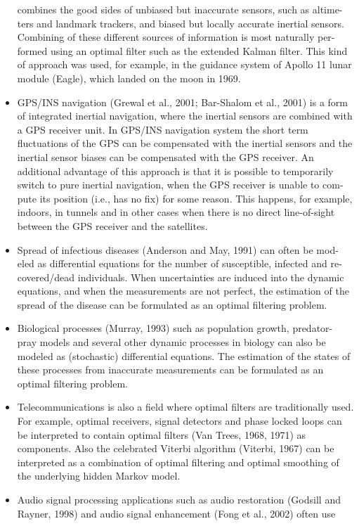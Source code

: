\documentclass[10pt]{llncs}
\begin{document}
\begin{itemize}
combines the good sides of unbiased but inaccurate sensors, such as altime-
ters and landmark trackers, and biased but locally accurate inertial sensors.
Combining of these different sources of information is most naturally per-
formed using an optimal filter such as the extended Kalman filter. This kind
of approach was used, for example, in the guidance system of Apollo 11
lunar module (Eagle), which landed on the moon in 1969.
\item GPS/INS navigation (Grewal et al., 2001; Bar-Shalom et al., 2001) is a form
of integrated inertial navigation, where the inertial sensors are combined
with a GPS receiver unit. In GPS/INS navigation system the short term
fluctuations of the GPS can be compensated with the inertial sensors and
the inertial sensor biases can be compensated with the GPS receiver. An
additional advantage of this approach is that it is possible to temporarily
switch to pure inertial navigation, when the GPS receiver is unable to com-
pute its position (i.e., has no fix) for some reason. This happens, for example,
indoors, in tunnels and in other cases when there is no direct line-of-sight
between the GPS receiver and the satellites.
\item Spread of infectious diseases (Anderson and May, 1991) can often be mod-
eled as differential equations for the number of susceptible, infected and re-
covered/dead individuals. When uncertainties are induced into the dynamic
equations, and when the measurements are not perfect, the estimation of the
spread of the disease can be formulated as an optimal filtering problem.
\item Biological processes (Murray, 1993) such as population growth, predator-
pray models and several other dynamic processes in biology can also be
modeled as (stochastic) differential equations. The estimation of the states
of these processes from inaccurate measurements can be formulated as an
optimal filtering problem.
\item Telecommunications is also a field where optimal filters are traditionally
used. For example, optimal receivers, signal detectors and phase locked
loops can be interpreted to contain optimal filters (Van Trees, 1968, 1971)
as components. Also the celebrated Viterbi algorithm (Viterbi, 1967) can be
interpreted as a combination of optimal filtering and optimal smoothing of
the underlying hidden Markov model.
\item Audio signal processing applications such as audio restoration (Godsill and
Rayner, 1998) and audio signal enhancement (Fong et al., 2002) often use

\end{itemize}
\end{document}
